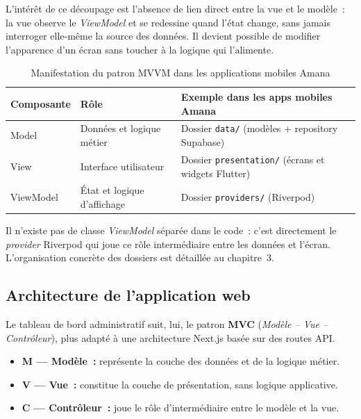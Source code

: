 \documentclass[12pt,fleqn,a4paper]{report}
\begin{document}
\begin{justify}
L'intérêt de ce découpage est l'absence de lien direct entre la vue et le modèle~: la vue observe le \textit{ViewModel} et se redessine quand l'état change, sans jamais interroger elle-même la source des données. Il devient possible de modifier l'apparence d'un écran sans toucher à la logique qui l'alimente.

\begin{table}[H]
\centering
\renewcommand{\arraystretch}{1.4}
\begin{tabular}{|l|l|l|}
\hline
\textbf{Composante} & \textbf{Rôle} & \textbf{Exemple dans les apps mobiles Amana} \\
\hline
Model & Données et logique métier & Dossier \texttt{data/} (modèles + repository Supabase) \\
\hline
View & Interface utilisateur & Dossier \texttt{presentation/} (écrans et widgets Flutter) \\
\hline
ViewModel & État et logique d'affichage & Dossier \texttt{providers/} (Riverpod) \\
\hline
\end{tabular}
\caption{Manifestation du patron MVVM dans les applications mobiles Amana}
\end{table}

Il n'existe pas de classe \textit{ViewModel} séparée dans le code~: c'est directement le \textit{provider} Riverpod qui joue ce rôle intermédiaire entre les données et l'écran. L'organisation concrète des dossiers est détaillée au chapitre~3.

\subsection{Architecture de l'application web}

Le tableau de bord administratif suit, lui, le patron \textbf{MVC} (\textit{Modèle -- Vue -- Contrôleur}), plus adapté à une architecture Next.js basée sur des routes API.

\begin{itemize}
    \item \textbf{M — Modèle~:} représente la couche des données et de la logique métier.
    \item \textbf{V — Vue~:} constitue la couche de présentation, sans logique applicative.
    \item \textbf{C — Contrôleur~:} joue le rôle d'intermédiaire entre le modèle et la vue.
\end{itemize}


\end{justify}
\end{document}
